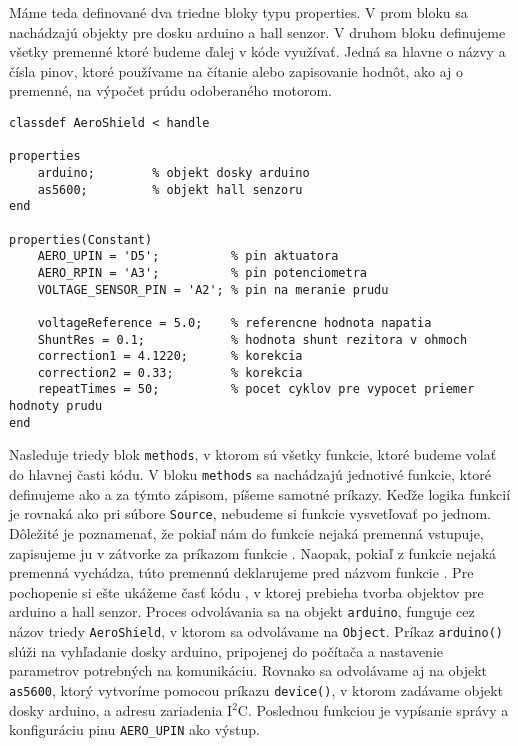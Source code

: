 Máme teda definované dva triedne bloky typu properties. V prom bloku sa nachádzajú objekty pre dosku arduino a hall senzor. V druhom bloku definujeme všetky premenné ktoré budeme ďalej v kóde využívať. Jedná sa hlavne o názvy a čísla pinov, ktoré používame na čítanie alebo zapisovanie hodnôt, ako aj o premenné, na výpočet prúdu odoberaného motorom. 

\begin{lstlisting}[caption={Knižnica AeroShield.m properties.},captionpos=b]
classdef AeroShield < handle

properties
	arduino;		% objekt dosky arduino 
	as5600;			% objekt hall senzoru
end

properties(Constant)
	AERO_UPIN = 'D5';          % pin aktuatora 
	AERO_RPIN = 'A3';          % pin potenciometra
	VOLTAGE_SENSOR_PIN = 'A2'; % pin na meranie prudu
	
	voltageReference = 5.0;    % referencne hodnota napatia 
	ShuntRes = 0.1;            % hodnota shunt rezitora v ohmoch
	correction1 = 4.1220;	   % korekcia  				  
	correction2 = 0.33;        % korekcia
	repeatTimes = 50;          % pocet cyklov pre vypocet priemer hodnoty prudu 
end		
\end{lstlisting}
		
Nasleduje triedy blok \verb|methods|, v ktorom sú všetky funkcie, ktoré budeme volať do hlavnej časti kódu. V bloku \verb|methods| sa nachádzajú jednotivé funkcie, ktoré definujeme ako  a za týmto zápisom, píšeme samotné príkazy. Keďže logika funkcií je rovnaká ako pri súbore \verb|Source|, nebudeme si funkcie vysvetľovať po jednom. Dôležité je poznamenať, že pokiaľ nám do funkcie nejaká premenná vstupuje, zapisujeme ju v zátvorke za príkazom funkcie . Naopak, pokiaľ z funkcie nejaká premenná vychádza, túto premennú deklarujeme pred názvom funkcie . Pre pochopenie si ešte ukážeme časť kódu , v ktorej prebieha tvorba objektov pre arduino a hall senzor. Proces odvolávania sa na objekt \verb|arduino|, funguje cez názov triedy \verb|AeroShield|, v ktorom sa odvolávame na \verb|Object|. Príkaz \verb|arduino()| slúži na vyhľadanie dosky arduino, pripojenej do počítača a nastavenie parametrov potrebných na komunikáciu. Rovnako sa odvolávame aj na objekt \verb|as5600|, ktorý vytvoríme pomocou príkazu \verb|device()|, v ktorom zadávame objekt dosky arduino, a adresu zariadenia I$^2$C. Poslednou funkciou je vypísanie správy a konfiguráciu pinu \verb|AERO_UPIN| ako výstup. 

